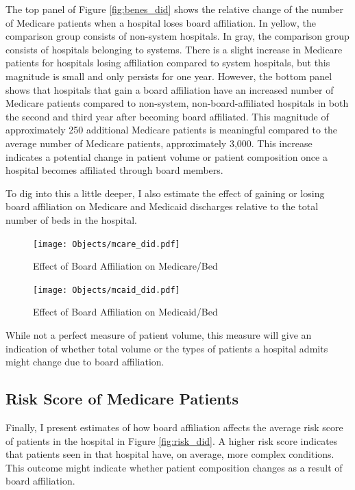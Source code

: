 \documentclass[12pt]{article}
\begin{document}
    The top panel of Figure \ref{fig:benes_did} shows the relative change of the number of Medicare patients when a hospital loses board affiliation. In yellow, the comparison group consists of non-system hospitals. In gray, the comparison group consists of hospitals belonging to systems. There is a slight increase in Medicare patients for hospitals losing affiliation compared to system hospitals, but this magnitude is small and only persists for one year. However, the bottom panel shows that hospitals that gain a board affiliation have an increased number of Medicare patients compared to non-system, non-board-affiliated hospitals in both the second and third year after becoming board affiliated. This magnitude of approximately 250 additional Medicare patients is meaningful compared to the average number of Medicare patients, approximately 3,000. This increase indicates a potential change in patient volume or patient composition once a hospital becomes affiliated through board members. 

    To dig into this a little deeper, I also estimate the effect of gaining or losing board affiliation on Medicare and Medicaid discharges relative to the total number of beds in the hospital. 

    \begin{figure}[ht!]
        \centering
        \caption{Effect of Board Affiliation on Medicare/Bed}
        \texttt{[image: Objects/mcare\_did.pdf]}
        \label{fig:mcare_did}
    \end{figure}

    \begin{figure}[ht!]
        \centering
        \caption{Effect of Board Affiliation on Medicaid/Bed}
        \texttt{[image: Objects/mcaid\_did.pdf]}
        \label{fig:mcaid_did}
    \end{figure}

    While not a perfect measure of patient volume, this measure will give an indication of whether total volume or the types of patients a hospital admits might change due to board affiliation. 

    \subsection{Risk Score of Medicare Patients}

    Finally, I present estimates of how board affiliation affects the average risk score of patients in the hospital in Figure \ref{fig:risk_did}. A higher risk score indicates that patients seen in that hospital have, on average, more complex conditions. This outcome might indicate whether patient composition changes as a result of board affiliation. 
\end{document}
